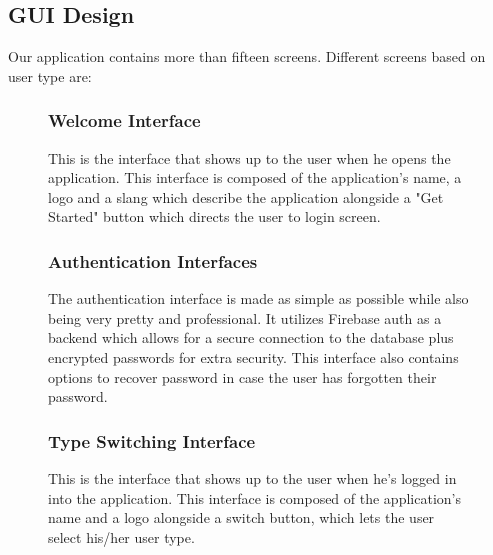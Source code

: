 \subsection{GUI Design}
Our application contains more than fifteen screens. Different screens based on user type are:

\begin{figure}
\subsubsection{Welcome Interface}
This is the interface that shows up to the user when he opens the application. This interface is composed of the application’s name, a logo and a slang which describe the application alongside a "Get Started" button which directs the user to login screen.

\centering
{}
\end{figure}

\begin{figure}
\subsubsection{Authentication Interfaces}
The authentication interface is made as simple as possible while also being very pretty and professional. It utilizes Firebase auth as a backend which allows for a secure connection to the database plus encrypted passwords for extra security. This interface also contains options to recover password in case the user has forgotten their password.

\centering
\hspace*{\fill}
\hfill 
{}\hfil
{}
\end{figure}

\begin{figure}
\subsubsection{Type Switching Interface}
This is the interface that shows up to the user when he’s logged in into the application. This interface is composed of the application’s name and a logo alongside a switch button, which lets the user select his/her user type.

\centering
{}
\end{figure}

